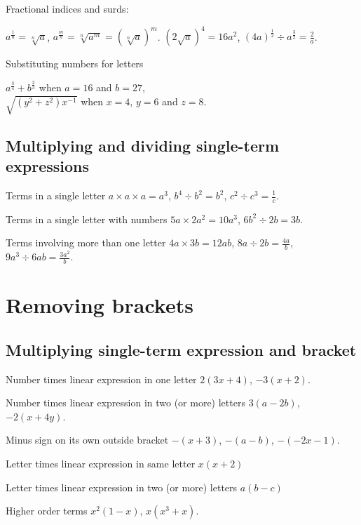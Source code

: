 \documentclass{article}
\begin{document}
Fractional indices and surds:

\(a^{\frac{1}{n}} = \sqrt[n]{a}\), \(a^{\frac{m}{n}} = \sqrt[n]{a^m} = \left(  \sqrt[n]{a} \right) ^m\). \hfill
\(\left(  2 \sqrt{a}\right)  ^4 = 16a^2\), \((4a)^{\frac{1}{2}} \div a^\frac{3}{2} = \frac{2}{a}\).

Substituting numbers for letters
\vspace{-1.1cm}
\begin{flushright}
\hfill \(a^\frac{3}{4} + b^\frac{2}{3}\) when \(a = 16\) and \(b = 27\), \\
\(\sqrt{(y^2 + z^2)x^{-1}}\) when \(x = 4\), \(y = 6\) and \(z = 8\).
\end{flushright}

\subsection{Multiplying and dividing single-term expressions}

Terms in a single letter \hfill \(a \times a \times a = a^3\), \(b^4 \div b^2 = b^2\), \(c^2 \div c^3 = \frac{1}{c}\).

Terms in a single letter with numbers \hfill \(5a \times 2a^2 = 10a^3\), \(6b^2 \div 2b = 3b\).

Terms involving more than one letter \hfill \(4a \times 3b = 12ab\), \(8a \div 2b = \frac{4a}{b}\), \(9a^3 \div 6ab = \frac{3a^2}{b}\).

\section{Removing brackets}

\subsection{Multiplying single-term expression and bracket}

Number times linear expression in one letter \hfill \(2(3x +4)\), \(-3(x+2)\).

Number times linear expression in two (or more) letters \hfill \(3(a-2b)\), \(-2(x+4y)\).

Minus sign on its own outside bracket \hfill \(-(x+3)\), \(-(a-b)\), \(-(-2x-1)\).

Letter times linear expression in same letter \hfill \(x(x+2)\)

Letter times linear expression in two (or more) letters \hfill \(a(b-c)\)

Higher order terms \hfill \(x^2(1-x)\), \(x(x^3+x)\).
\end{document}
